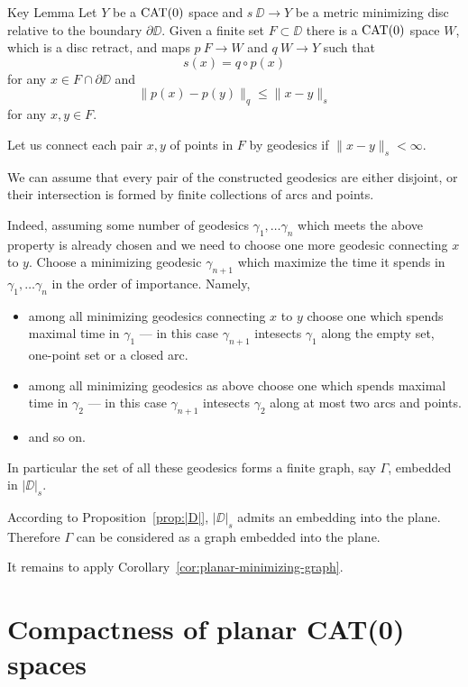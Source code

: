 \documentclass[a4paper,10pt]{amsart}
\begin{document}
\begin{thm}{Key Lemma}\label{lem:key}
Let $Y$ be a $\mathop{\rm CAT}\nolimits(0)$ space and $s\:\DD\to Y$ 
be a metric minimizing disc relative to the boundary $\partial \DD$.
Given a finite set $F\subset \DD$
there is a $\mathop{\rm CAT}\nolimits(0)$ space $W$, which is a disc retract,
and maps $p\:F\to W$ and $q\:W\to Y$ such that
\[s(x)=q\circ p(x)\] 
for any $x\in F\cap \partial \DD$
and 
\[\|p(x)-p(y)\|_q\le \|x-y\|_s\] 
for any $x,y\in F$.
\end{thm}

Let us connect each pair $x,y$ of points in $F$ by geodesics
if $\|x-y\|_s<\infty$.

We can assume that 
every pair of the constructed geodesics 
are either disjoint, or their intersection is formed by finite collections of arcs and points.

Indeed, assuming some number of geodesics $\gamma_1,\dots\gamma_n$ which meets the above property is already chosen and we need to choose one more geodesic connecting $x$ to $y$.
Choose a minimizing geodesic $\gamma_{n+1}$ which maximize the time it spends in $\gamma_1,\dots\gamma_n$  in the order of importance.
Namely, 
\begin{itemize}
\item  among all minimizing geodesics connecting $x$ to $y$
choose one which spends maximal time in $\gamma_1$ --- in this case $\gamma_{n+1}$ intesects $\gamma_1$ along the empty set, one-point set or a closed arc.
\item among all minimizing geodesics as above
choose one which spends maximal time in $\gamma_2$ --- in this case $\gamma_{n+1}$ intesects $\gamma_2$ along at most two arcs and points.
\item and so on.
\end{itemize}


In particular the set of all these geodesics forms a finite graph, say $\Gamma$,
embedded in $|\DD|_s$. 

According to Proposition~\ref{prop:|D|},
$|\DD|_s$ admits an embedding into the plane.
Therefore $\Gamma$ can be considered as a graph embedded into the plane.

It remains to apply Corollary~\ref{cor:planar-minimizing-graph}.
\qeds

\section{Compactness of planar CAT(0) spaces}
\end{document}
